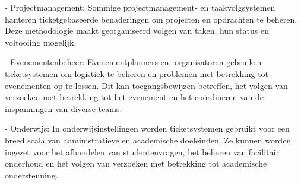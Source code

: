- Projectmanagement: Sommige projectmanagement- en taakvolgsystemen hanteren ticketgebaseerde benaderingen om projecten en opdrachten te beheren. Deze methodologie maakt georganiseerd volgen van taken, hun status en voltooiing mogelijk.

- Evenementenbeheer: Evenementplanners en -organisatoren gebruiken ticketsystemen om logistiek te beheren en problemen met betrekking tot evenementen op te lossen. Dit kan toegangsbewijzen betreffen, het volgen van verzoeken met betrekking tot het evenement en het coördineren van de inspanningen van diverse teams.

- Onderwijs: In onderwijsinstellingen worden ticketsystemen gebruikt voor een breed scala van administratieve en academische doeleinden. Ze kunnen worden ingezet voor het afhandelen van studentenvragen, het beheren van facilitair onderhoud en het volgen van verzoeken met betrekking tot academische ondersteuning.
